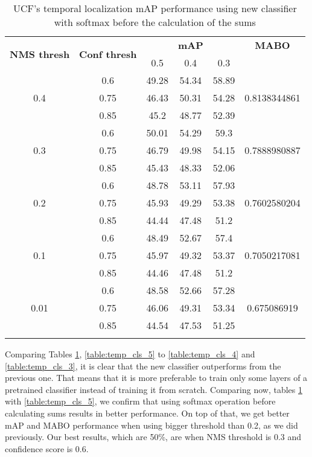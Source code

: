 \begin{center}
\setlength{\tabcolsep}{2pt}
  \begin{longtable}{|| c | c || c c c | c ||}

    \hline
     \multirow{2}{*}{\textbf{NMS thresh}} & \multirow{2}{*}{\textbf{Conf thresh}} & {} & \textbf{mAP} & {} & \textbf{MABO} \\
     {} & {} & 0.5 & 0.4 & 0.3 & {}\\
    \hline
    \multirow{3}{*}{0.4} & 0.6 & 49.28 & 54.34 & 58.89 & \multirow{3}{*}{0.8138344861}\\
    \cline{2-5}
    {} & 0.75 & 46.43 & 50.31 & 54.28 & {}\\
    \cline{2-5}
    {} & 0.85 & 45.2 & 48.77 & 52.39 & {}\\
    \hline
    \multirow{3}{*}{0.3} & 0.6 & 50.01 & 54.29 & 59.3  & \multirow{3}{*}{0.7888980887}\\
    \cline{2-5}
    {} & 0.75 & 46.79 & 49.98 & 54.15 & {}\\
    \cline{2-5}
    {} & 0.85 & 45.43 & 48.33 & 52.06 & {}\\
    \hline
    \multirow{3}{*}{0.2} & 0.6 & 48.78& 53.11 & 57.93 & \multirow{3}{*}{0.7602580204}\\
    \cline{2-5}
    {} & 0.75 & 45.93 & 49.29 & 53.38 & {}\\
    \cline{2-5}
    {} & 0.85 & 44.44 & 47.48 & 51.2  & {}\\
    \hline
    \multirow{3}{*}{0.1} & 0.6 & 48.49 & 52.67 & 57.4 & \multirow{3}{*}{0.7050217081}\\
    \cline{2-5}
    {} & 0.75 & 45.97 & 49.32 & 53.37 & {} \\
    \cline{2-5}
    {} & 0.85 & 44.46 & 47.48 & 51.2 & {}\\
    \hline
    \multirow{3}{*}{0.01} & 0.6 & 48.58 & 52.66 & 57.28  & \multirow{3}{*}{0.675086919}\\
    \cline{2-5}
    {} & 0.75 & 46.06 & 49.31 & 53.34 & {} \\
    \cline{2-5}
    {} & 0.85 & 44.54 & 47.53 & 51.25 & {}\\
    \hline

    \caption{UCF's temporal localization mAP performance using new classifier with softmax before the calculation of the sums}
    \label{table:temp_cls_6}
  \end{longtable}
\end{center}

Comparing Tables \ref{table:temp_cls_6}, \ref{table:temp_cls_5} to \ref{table:temp_cls_4} and \ref{table:temp_cls_3}, it is clear that the new classifier outperforms from the previous one.
That means that it is more preferable to train only some layers of a pretrained classifier instead of training it from scratch. Comparing now, tables \ref{table:temp_cls_6} with
\ref{table:temp_cls_5}, we confirm that using softmax operation before calculating sums results in better performance. On top of that, we get better mAP and MABO performance when
using bigger threshold than 0.2, as we did previously. Our best results, which are 50\%, are when NMS threshold is 0.3 and confidence score is 0.6.

% 
